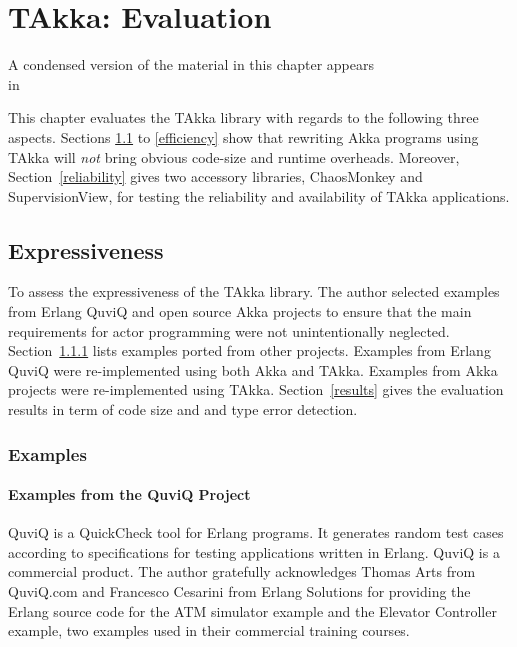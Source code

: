 \chapter{TAkka: Evaluation}
\label{takka_evaluation}

\begin{center}
A condensed version of the material in this chapter appears \\ in~\citep[Section 6, 7 and 8]{TAKKA_paper}
\end{center}
\vspace{12 pt}

This chapter evaluates the TAkka library with regards to the following three 
aspects.  Sections \ref{expressiveness} to \ref{efficiency} show that rewriting 
Akka programs using TAkka will {\it not} bring obvious code-size and runtime overheads. 
Moreover, Section~\ref{reliability} gives two accessory libraries, ChaosMonkey 
and SupervisionView, for testing the reliability and availability of TAkka 
applications. 





\section{Expressiveness}
\label{expressiveness}

To assess the expressiveness of the TAkka library.  The author  
selected examples from Erlang QuviQ \citep{quviq}
and open source Akka projects to ensure that the main requirements for actor 
programming were not unintentionally neglected.  Section~\ref{examples}
lists examples ported from other projects. Examples from Erlang 
QuviQ were re-implemented using both Akka and TAkka.  Examples from 
Akka projects were re-implemented using TAkka.   Section~\ref{results}
gives the evaluation results in term of code size and and type error
detection.

\subsection{Examples}
\label{examples}

\subsubsection{Examples from the QuviQ Project}

QuviQ \citep{quviq} is a QuickCheck tool for Erlang programs.  It generates 
random test cases according to specifications for testing applications written 
in Erlang.  QuviQ is a commercial product.  The author gratefully acknowledges 
Thomas Arts from QuviQ.com and Francesco Cesarini from Erlang Solutions 
for providing the Erlang source code for the ATM simulator example and the 
Elevator Controller example, two examples used in their commercial training 
courses.

